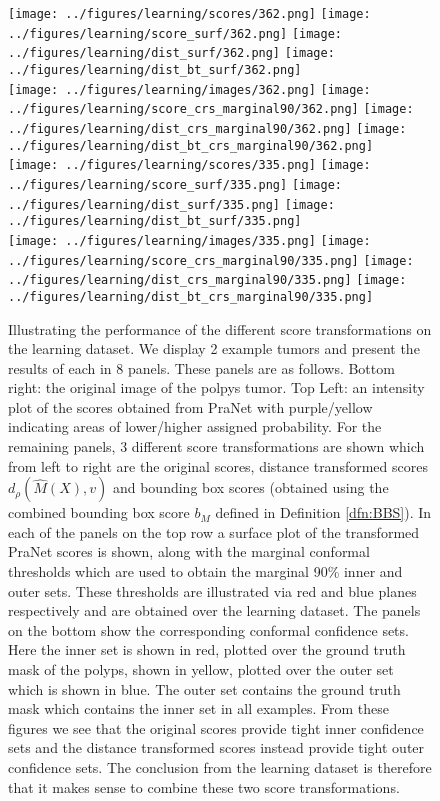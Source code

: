 \begin{figure}
\begin{center}
	\texttt{[image: ../figures/learning/scores/362.png]}
		\texttt{[image: ../figures/learning/score\_surf/362.png]}	\texttt{[image: ../figures/learning/dist\_surf/362.png]}
		\texttt{[image: ../figures/learning/dist\_bt\_surf/362.png]}\\
		\texttt{[image: ../figures/learning/images/362.png]}
	\texttt{[image: ../figures/learning/score\_crs\_marginal90/362.png]}
	\texttt{[image: ../figures/learning/dist\_crs\_marginal90/362.png]}
	\texttt{[image: ../figures/learning/dist\_bt\_crs\_marginal90/362.png]}\\
\vspace{0.5cm}
		\texttt{[image: ../figures/learning/scores/335.png]}
	\texttt{[image: ../figures/learning/score\_surf/335.png]}	\texttt{[image: ../figures/learning/dist\_surf/335.png]}
	\texttt{[image: ../figures/learning/dist\_bt\_surf/335.png]}\\
	\texttt{[image: ../figures/learning/images/335.png]}
	\texttt{[image: ../figures/learning/score\_crs\_marginal90/335.png]}
	\texttt{[image: ../figures/learning/dist\_crs\_marginal90/335.png]}
	\texttt{[image: ../figures/learning/dist\_bt\_crs\_marginal90/335.png]}
\end{center}
	\caption{Illustrating the performance of the different score transformations on the learning dataset. We display 2 example tumors and present the results of each in 8 panels. These panels are as follows. Bottom right: the original image of the polpys tumor. Top Left: an intensity plot of the scores obtained from PraNet with purple/yellow indicating areas of lower/higher assigned probability. For the remaining panels, 3 different score transformations are shown which from left to right are the original scores, distance transformed scores $d_\rho(\hat{M}(X), v)$ and bounding box scores (obtained using the combined bounding box score $b_M$ defined in Definition \ref{dfn:BBS}). In each of the panels on the top row a surface plot of the transformed PraNet scores is shown, along with the marginal conformal thresholds which are used to obtain the marginal 90\% inner and outer sets.  These thresholds are illustrated via red and blue planes respectively and are obtained over the learning dataset. The panels on the bottom show the corresponding conformal confidence sets. Here the inner set is shown in red, plotted over the ground truth mask of the polyps, shown in yellow, plotted over the outer set which is shown in blue. The outer set contains the ground truth mask which contains the inner set in all examples. From these figures we see that the original scores provide tight inner confidence sets and the distance transformed scores instead provide tight outer confidence sets. The conclusion from the learning dataset is therefore that it makes sense to combine these two score transformations.}

\end{figure}
